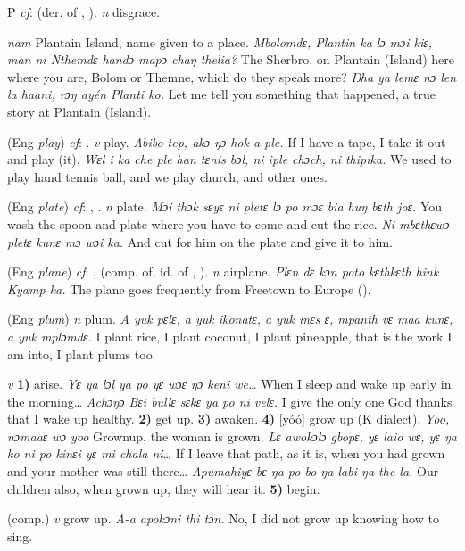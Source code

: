 \begin{letter}{P}
 \textit{cf}:  (der. of , ). \textit{n} disgrace.

 \textit{nam} Plantain Island, name given to a place. \textit{Mbolomdɛ, Plantin ka lɔ mɔi kiɛ, man ni Nthemdɛ handɔ mapɔ chaŋ thelia?} The Sherbro, on Plantain (Island) here where you are, Bolom or Themne, which do they speak more? \textit{Ŋha ya lemɛ nɔ len la haani, rɔŋ ayén Planti ko.} Let me tell you something that happened, a true story at Plantain (Island).

 (Eng \textit{play}) \textit{cf}: . \textit{v} play. \textit{Abibo tep, akɔ ŋɔ hok a ple.} If I have a tape, I take it out and play (it). \textit{Wɛl i ka che ple han tɛnis bɔl, ni iple chɔch, ni thipika.} We used to play hand tennis ball, and we play church, and other ones.

 (Eng \textit{plate}) \textit{cf}: , . \textit{n} plate. \textit{Mɔi thɔk sɛyɛ ni pletɛ lɔ po mɔɛ bia huŋ bɛth joɛ.} You wash the spoon and plate where you have to come and cut the rice. \textit{Ni mbɛthɛwɔ pletɛ kunɛ mɔ wɔi ka.} And cut for him on the plate and give it to him.

 (Eng \textit{plane}) \textit{cf}: ,  (comp. of, id. of , ). \textit{n} airplane. \textit{Plɛn dɛ kɔn poto kɛthkɛth hink Kyamp ka.} The plane goes frequently from Freetown to Europe (\citealt{Pichl1967}). 

 (Eng \textit{plum}) \textit{n} plum. \textit{A yuk pɛlɛ, a yuk ikonatɛ, a yuk inɛs ɛ, mpanth vɛ maa kunɛ, a yuk mplɔmdɛ.} I plant rice, I plant coconut, I plant pineapple, that is the work I am into, I plant plums too.

 \textit{v} \textbf{1)} arise. \textit{Yɛ ya lɔl ya po yɛ wɔɛ ŋɔ keni we…} When I sleep and wake up early in the morning… \textit{Achɔŋɔ Bɛi bullɛ sɛkɛ ya po ni velɛ.} I give the only one God thanks that I wake up healthy. \textbf{2)} get up. \textbf{3)} awaken. \textbf{4)} [yóó] grow up (K dialect). \textit{Yoo, nɔmaaɛ wɔ yoo} Grownup, the woman is grown. \textit{Lɛ awokɔlɔ gbopɛ, yɛ laio wɛ, yɛ ŋa ko ni po kinɛi yɛ mi chala ni}… If I leave that path, as it is, when you had grown and your mother was still there… \textit{Apumahiyɛ bɛ ŋa po bo ŋa labi ŋa the la.} Our children also, when grown up, they will hear it. \textbf{5)} begin.

 (comp.) \textit{v} grow up. \textit{A-a apokɔni thi tɔn.} No, I did not grow up knowing how to sing.


\end{letter}
